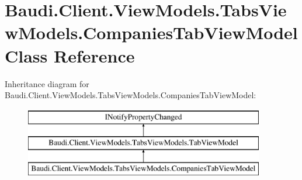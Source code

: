 \hypertarget{class_baudi_1_1_client_1_1_view_models_1_1_tabs_view_models_1_1_companies_tab_view_model}{}\section{Baudi.\+Client.\+View\+Models.\+Tabs\+View\+Models.\+Companies\+Tab\+View\+Model Class Reference}
\label{class_baudi_1_1_client_1_1_view_models_1_1_tabs_view_models_1_1_companies_tab_view_model}
Inheritance diagram for Baudi.\+Client.\+View\+Models.\+Tabs\+View\+Models.\+Companies\+Tab\+View\+Model\+:\begin{figure}[H]
\begin{center}
\leavevmode
\includegraphics[height=3.000000cm]{class_baudi_1_1_client_1_1_view_models_1_1_tabs_view_models_1_1_companies_tab_view_model}
\end{center}
\end{figure}
